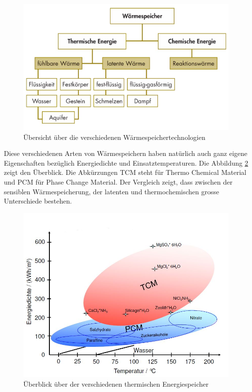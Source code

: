 \documentclass[11pt,a4paper]{scrartcl}
\begin{document}
\begin{figure}[h]
\begin{center}
\includegraphics[scale=0.3]{images/speicher.jpg}
\caption{Übersicht über die verschiedenen Wärmespeichertechnologien
\cite{BINE1}}
\label{fig:Wärmespeicher}
\end{center}
\end{figure}


Diese verschiedenen Arten von Wärmespeichern haben natürlich auch ganz eigene
Eigenschaften bezüglich Energiedichte und Einsatztemperaturen. Die Abbildung
\ref{fig:temperaturenergiedichte} zeigt den Überblick. Die Abkürzungen TCM steht
für Thermo Chemical Material und PCM für Phase Change Material. Der
Vergleich zeigt, dass zwischen der sensiblen Wärmespeicherung, der latenten
und thermochemischen grosse Unterschiede bestehen.

\begin{figure}[h]
\begin{center}
\includegraphics[scale=0.4]{images/temperaturenergiedichte.jpg}
\caption{Überblick über der verschiedenen thermischen Energiespeicher
\cite{zaebayern}}
\label{fig:temperaturenergiedichte}
\end{center}
\end{figure}
\end{document}
